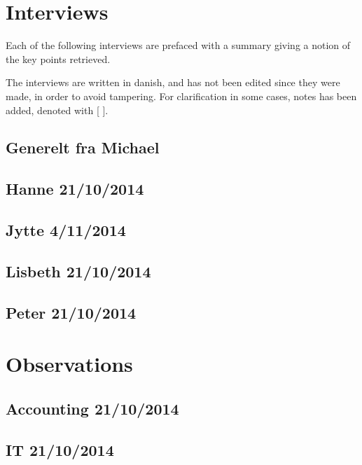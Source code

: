 \chapter{Interviews}
\label{app:interviews}
Each of the following interviews are prefaced with a summary giving a notion of the key points retrieved.

The interviews are written in danish, and has not been edited since they were made, in order to avoid tampering.
For clarification in some cases, notes has been added, denoted with [ ].

\section{Generelt fra Michael}

\section{Hanne 21/10/2014}

\section{Jytte 4/11/2014}

\section{Lisbeth 21/10/2014}

\section{Peter 21/10/2014}

\chapter{Observations}
\section{Accounting 21/10/2014}

\section{IT 21/10/2014}
